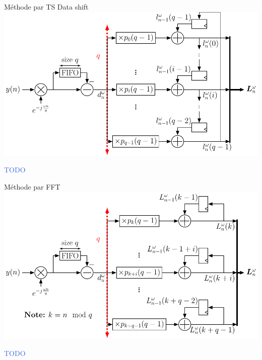 \documentclass[../main.tex]{subfiles}
\begin{document}
\begin{frame}{Méthode par TS Data shift}
  \includegraphics[width=\linewidth]{figures/tikzpicture/arch_statts_sync_stdl.pdf}
  \begin{center}
    \textcolor{RoyalBlue}{TODO}
  \end{center}
\end{frame}

\begin{frame}{Méthode par FFT}
  \includegraphics[width=\linewidth]{figures/tikzpicture/arch_subts_sync_stdl.pdf}
  \begin{center}
    \textcolor{RoyalBlue}{TODO}
  \end{center}
\end{frame}
\end{document}
